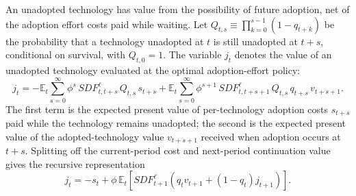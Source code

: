 \documentclass[a4paper,11pt]{article}
\begin{document}
An unadopted technology has value from the possibility of future adoption, net of the adoption effort costs paid while waiting.
Let $Q_{t,s}\equiv\prod_{k=0}^{s-1}(1-q_{t+k})$ be the probability that a technology unadopted at $t$ is still unadopted at $t+s$, conditional on survival, with $Q_{t,0}=1$.
The variable $j_t$ denotes the value of an unadopted technology evaluated at the optimal adoption-effort policy:
\[
    j_t =
    -\mathbb{E}_t \sum_{s=0}^{\infty}\phi^{s}\,\mathit{SDF}^{\ell}_{t,t+s}\,Q_{t,s}\,s_{t+s}
    +\mathbb{E}_t \sum_{s=0}^{\infty}\phi^{s+1}\,\mathit{SDF}^{\ell}_{t,t+s+1}\,Q_{t,s}\,q_{t+s}\,v_{t+s+1}.
\]
The first term is the expected present value of per-technology adoption costs $s_{t+s}$ paid while the technology remains unadopted; the second is the expected present value of the adopted-technology value $v_{t+s+1}$ received when adoption occurs at $t+s$.
Splitting off the current-period cost and next-period continuation value gives the recursive representation
\[
    j_t = -s_t + \phi\,\mathbb{E}_t\!\left[\mathit{SDF}^{\ell}_{t+1}\left(q_t v_{t+1} + (1-q_t)j_{t+1}\right)\right].
\]
\end{document}
